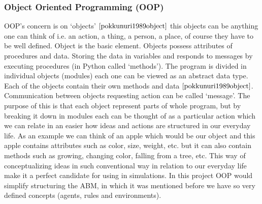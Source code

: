 \subsubsection{Object Oriented Programming (OOP)} \label{OOP}
OOP's concern is on `objects' $\cite{pokkunuri1989object}$ this objects can be anything one can think of i.e. an action, a thing, a person, a place, of course they have to be well defined. Object is the basic element. Objects possess attributes of procedures and data. Storing the data in variables and responds to messages by executing procedures (in Python called ‘methods’). The program is divided in individual objects (modules) each one can be viewed as an abstract data type. Each of the objects contain their own methods and data $\cite{pokkunuri1989object}$. Communication between objects requesting action can be called ‘message’. The purpose of this is that each object represent parts of whole program, but by breaking it down in modules each can be thought of as a particular action which we can relate in an easier how ideas and actions are structured in our everyday life. As an example we can think of an apple which would be our object and this apple contains attributes such as color, size, weight, etc. but it can also contain methods such as growing, changing color, falling from a tree, etc. This way of conceptualizing ideas in such conventional way in relation to our everyday life make it a perfect candidate for using in simulations. In this project OOP would simplify structuring the ABM, in which it was mentioned before we have so very defined concepts (agents, rules and environments). 
